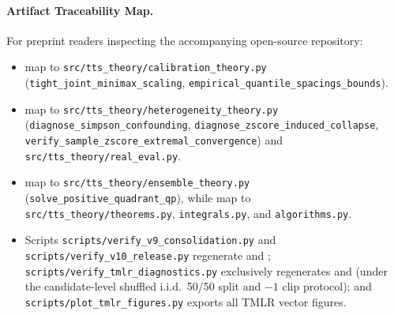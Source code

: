 \documentclass[10pt]{article}
\theoremstyle{plain}
\theoremstyle{definition}
\theoremstyle{remark}
\begin{document}
\paragraph{Artifact Traceability Map.}
{\raggedright\footnotesize
For preprint readers inspecting the accompanying open-source repository:
\begin{itemize}[leftmargin=1.4em,itemsep=1pt,topsep=2pt]
\item {} map to \texttt{src/\allowbreak tts\_theory/\allowbreak calibration\_theory.py} (\texttt{tight\_\allowbreak joint\_\allowbreak minimax\_\allowbreak scaling}, \texttt{empirical\_\allowbreak quantile\_\allowbreak spacings\_\allowbreak bounds}).
\item {} map to \texttt{src/\allowbreak tts\_theory/\allowbreak heterogeneity\_theory.py} (\texttt{diagnose\_\allowbreak simpson\_\allowbreak confounding}, \texttt{diagnose\_\allowbreak zscore\_\allowbreak induced\_\allowbreak collapse}, \texttt{verify\_\allowbreak sample\_\allowbreak zscore\_\allowbreak extremal\_\allowbreak convergence}) and \texttt{src/\allowbreak tts\_theory/\allowbreak real\_eval.py}.
\item {} map to \texttt{src/\allowbreak tts\_theory/\allowbreak ensemble\_theory.py} (\texttt{solve\_\allowbreak positive\_\allowbreak quadrant\_\allowbreak qp}), while  map to \texttt{src/\allowbreak tts\_theory/\allowbreak theorems.py}, \texttt{integrals.py}, and \texttt{algorithms.py}.
\item Scripts \texttt{scripts/\allowbreak verify\_\allowbreak v9\_\allowbreak consolidation.py} and \texttt{scripts/\allowbreak verify\_\allowbreak v10\_\allowbreak release.py} regenerate  and ; \texttt{scripts/\allowbreak verify\_\allowbreak tmlr\_\allowbreak diagnostics.py} exclusively regenerates  and  (under the candidate-level shuffled i.i.d.\ 50/50 split and $-1$ clip protocol); and \texttt{scripts/\allowbreak plot\_\allowbreak tmlr\_\allowbreak figures.py} exports all TMLR vector figures.
\end{itemize}\par}
\fi
\end{document}
